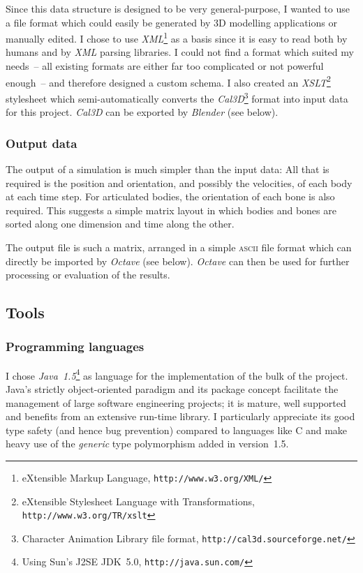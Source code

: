 Since this data structure is designed to be very general-purpose, I wanted to use a file format
which could easily be generated by 3D modelling applications or manually edited. I chose to use
\textsl{XML}\footnote{eXtensible Markup Language, \texttt{http://www.w3.org/XML/}} as a basis
since it is easy to read both by humans and by \textsl{XML} parsing libraries. I could not
find a format which suited my needs~-- all existing formats are either far too complicated or not
powerful enough~-- and therefore designed a custom schema. I also created an
\textsl{XSLT}\footnote{eXtensible Stylesheet Language with Transformations,
\texttt{http://www.w3.org/TR/xslt}} stylesheet which semi-automatically converts the
\textsl{Cal3D}\footnote{Character Animation Library file format, \texttt{http://cal3d.sourceforge.net/}}
format into input data for this project. \textsl{Cal3D} can be exported by \textsl{Blender}
(see below).

\subsubsection{Output data}
The output of a simulation is much simpler than the input data: All that is required is the
position and orientation, and possibly the velocities, of each body at each time step. For
articulated bodies, the orientation of each bone is also required. This suggests a simple
matrix layout in which bodies and bones are sorted along one dimension and time along
the other.

The output file is such a matrix, arranged in a simple \textsc{ascii} file format which can
directly be imported by \textsl{Octave} (see below). \textsl{Octave} can then be used for further
processing or evaluation of the results.

\subsection{Tools}
\subsubsection{Programming languages}
I chose \textsl{Java~1.5}\footnote{Using Sun's J2SE JDK~5.0, \texttt{http://java.sun.com/}}
as language for the implementation of the bulk of the project. Java's strictly object-oriented
paradigm and its package concept facilitate the management of large software engineering
projects; it is mature, well supported and benefits from an extensive run-time library. I
particularly appreciate its good type safety (and hence bug prevention) compared to languages
like C and make heavy use of the \emph{generic} type polymorphism added in version~1.5.

